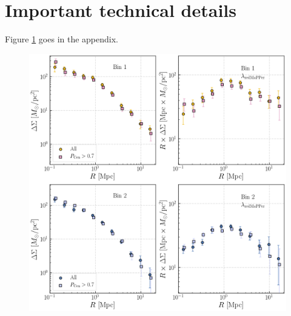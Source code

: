 \documentclass[a4paper,fleqn,usenatbib]{mnras}
\begin{document}
\section{Important technical details} 
	\label{app:smf_cov} 
    

Figure \ref{fig:pcen} goes in the appendix.

  \begin{figure}
      \centering 
      \includegraphics[width=12cm]{fig/png/redmapper_pcen}
      \caption{
          }
      \label{fig:pcen}
  \end{figure}




\bsp
\label{lastpage}
\end{document}
